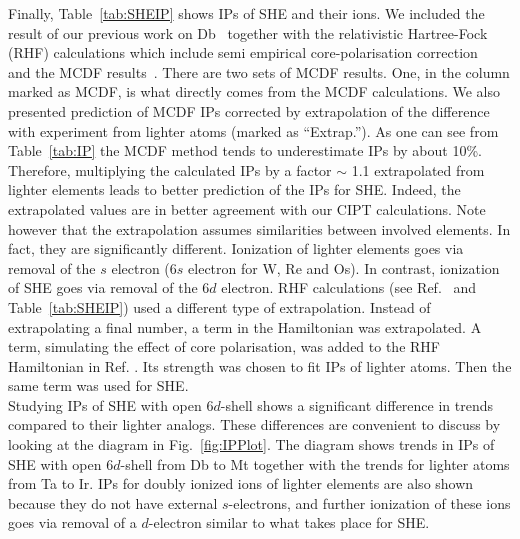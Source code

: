 \documentclass[10pt,a4paper, twoside, openright]{report}
\begin{document}
Finally, Table~\ref{tab:SHEIP} shows IPs of SHE and their ions. We included the result of our previous work on Db~\cite{LDFDb2018} together with the relativistic Hartree-Fock (RHF) calculations which include semi empirical core-polarisation correction~\cite{Dzuba2016} and the MCDF results~\cite{MCDF-Sg,MCDF-BhHs}. There are two sets of MCDF results. One, in the column marked as MCDF, is what directly comes from the MCDF calculations. We also presented prediction of MCDF IPs corrected by extrapolation of the difference with experiment from lighter atoms (marked as ``Extrap.''). As one can see from Table~\ref{tab:IP} the MCDF method tends to underestimate IPs by about 10\%. Therefore, multiplying the calculated IPs by a factor $\sim$ 1.1 extrapolated from lighter elements leads to better prediction of the IPs for SHE. Indeed, the extrapolated values are in better agreement with our CIPT calculations. Note however that the extrapolation assumes similarities between involved elements. In fact, they are significantly different. Ionization of lighter elements goes via removal of the $s$ electron ($6s$ electron for W, Re and Os). In contrast, ionization of SHE goes via removal of the $6d$ electron. RHF calculations (see Ref.~\cite{Dzuba2016} and Table~\ref{tab:SHEIP}) used a different type of extrapolation. Instead of extrapolating a final number, a term in the Hamiltonian was extrapolated. A term, simulating the effect of core polarisation, was added to the RHF Hamiltonian in Ref. \cite{Dzuba2016}. Its strength was chosen to fit IPs of lighter atoms. Then the same term was used for SHE. \\
\linebreak
Studying IPs of SHE with open $6d$-shell shows a significant difference in trends compared to their lighter analogs. These differences are convenient to discuss by looking at the diagram in Fig.~\ref{fig:IPPlot}. The diagram shows trends in IPs of SHE with open $6d$-shell from Db to Mt together with the trends for lighter atoms from Ta to Ir. IPs for doubly ionized ions of lighter elements are also shown because they do not have external $s$-electrons, and further ionization of these ions goes via removal of a $d$-electron similar to what takes place for SHE. \\
\linebreak
\end{document}

